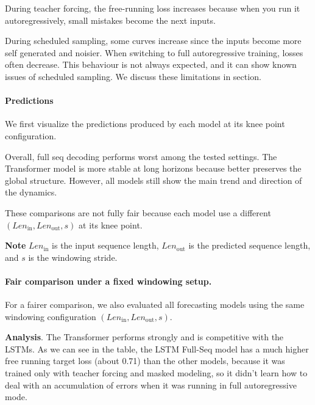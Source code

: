 During teacher forcing, the free-running loss increases because when you run it autoregressively, small mistakes become the next inputs.

During scheduled sampling, some curves increase since the inputs become more self generated and noisier.
When switching to full autoregressive training, losses often decrease. This behaviour is not always expected, and it can show known issues of scheduled sampling. We discuss these limitations in  section.

\paragraph{Predictions}
We first visualize the predictions produced by each model at its knee point configuration. 



Overall, full seq decoding performs worst among the tested settings. The Transformer model is more stable at long horizons because better preserves the global structure. However, all models still show the main trend and direction of the dynamics. 

These comparisons are not fully fair because each model use a different $(Len_\text{in},Len_\text{out},s)$ at its knee point.

\vspace{\baselineskip}

\noindent\textbf{Note} $Len_\text{in}$ is the input sequence length, $Len_\text{out}$ is the predicted sequence length, and $s$ is the windowing stride.

\paragraph{Fair comparison under a fixed windowing setup.}
For a fairer comparison, we also evaluated all forecasting models using the same windowing configuration $(Len_\text{in},Len_\text{out},s)$.



\textbf{Analysis}. The Transformer performs strongly and is competitive with the LSTMs. As we can see in the table, the LSTM Full-Seq model has a much higher free running target loss (about 0.71) than the other models, because it was trained only with teacher forcing and masked modeling, so it didn't learn how to deal with an accumulation of errors when it was running in full autoregressive mode.



